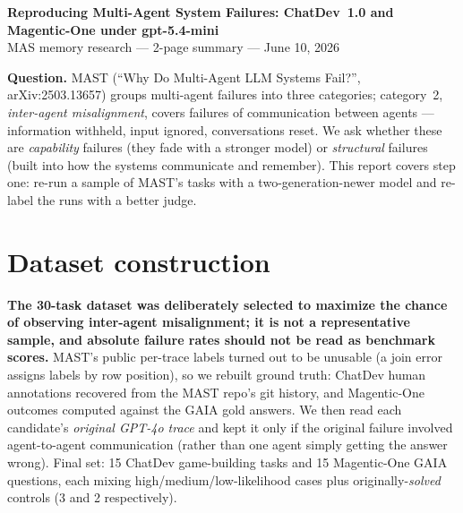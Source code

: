\documentclass[10pt]{article}
\begin{document}
\begin{center}
{\large\bfseries Reproducing Multi-Agent System Failures:
ChatDev~1.0 and Magentic-One under gpt-5.4-mini}\\[2pt]
MAS memory research --- 2-page summary --- June 10, 2026
\end{center}

\textbf{Question.} MAST (``Why Do Multi-Agent LLM Systems Fail?'',
arXiv:2503.13657) groups multi-agent failures into three categories;
category~2, \emph{inter-agent misalignment}, covers failures of communication
between agents --- information withheld, input ignored, conversations reset.
We ask whether these are \emph{capability} failures (they fade with a
stronger model) or \emph{structural} failures (built into how the systems
communicate and remember). This report covers step one: re-run a sample of
MAST's tasks with a two-generation-newer model and re-label the runs with a
better judge.

\section{Dataset construction}
\textbf{The 30-task dataset was deliberately selected to maximize the chance
of observing inter-agent misalignment; it is not a representative sample, and
absolute failure rates should not be read as benchmark scores.} MAST's public
per-trace labels turned out to be unusable (a join error assigns labels by
row position), so we rebuilt ground truth: ChatDev human annotations
recovered from the MAST repo's git history, and Magentic-One outcomes
computed against the GAIA gold answers. We then read each candidate's
\emph{original GPT-4o trace} and kept it only if the original failure
involved agent-to-agent communication (rather than one agent simply getting
the answer wrong). Final set: 15 ChatDev game-building tasks
and 15 Magentic-One GAIA questions, each mixing high/medium/low-likelihood
cases plus originally-\emph{solved} controls (3 and 2 respectively).
\end{document}
